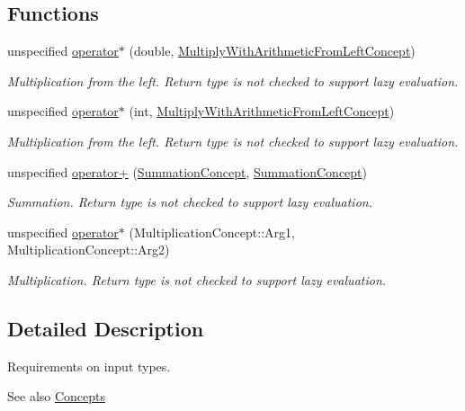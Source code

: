 \subsection*{\-Functions}
\begin{DoxyCompactItemize}
\item 
unspecified \hyperlink{group__ConceptGroup_ga10d0693d96a9ea69e9de1d10b0e4da1f}{operator$\ast$} (double, \hyperlink{structFunG_1_1Concepts_1_1MultiplyWithArithmeticFromLeftConcept}{\-Multiply\-With\-Arithmetic\-From\-Left\-Concept})
\begin{DoxyCompactList}\small\item\em \-Multiplication from the left. \-Return type is not checked to support lazy evaluation. \end{DoxyCompactList}\item 
unspecified \hyperlink{group__ConceptGroup_ga593fb8c43bd98b8eae6459f77874c7c7}{operator$\ast$} (int, \hyperlink{structFunG_1_1Concepts_1_1MultiplyWithArithmeticFromLeftConcept}{\-Multiply\-With\-Arithmetic\-From\-Left\-Concept})
\begin{DoxyCompactList}\small\item\em \-Multiplication from the left. \-Return type is not checked to support lazy evaluation. \end{DoxyCompactList}\item 
unspecified \hyperlink{group__ConceptGroup_gab9d1639ea6ed1088ec5bfbee24625f89}{operator+} (\hyperlink{structFunG_1_1Concepts_1_1SummationConcept}{\-Summation\-Concept}, \hyperlink{structFunG_1_1Concepts_1_1SummationConcept}{\-Summation\-Concept})
\begin{DoxyCompactList}\small\item\em \-Summation. \-Return type is not checked to support lazy evaluation. \end{DoxyCompactList}\item 
unspecified \hyperlink{group__ConceptGroup_ga02a0c88d20771819afda900e6bbf16f5}{operator$\ast$} (\-Multiplication\-Concept\-::\-Arg1, \-Multiplication\-Concept\-::\-Arg2)
\begin{DoxyCompactList}\small\item\em \-Multiplication. \-Return type is not checked to support lazy evaluation. \end{DoxyCompactList}\end{DoxyCompactItemize}


\subsection{\-Detailed \-Description}
\-Requirements on input types. \begin{DoxySeeAlso}{\-See also}
\hyperlink{namespaceFunG_1_1Concepts}{\-Concepts} 
\end{DoxySeeAlso}

